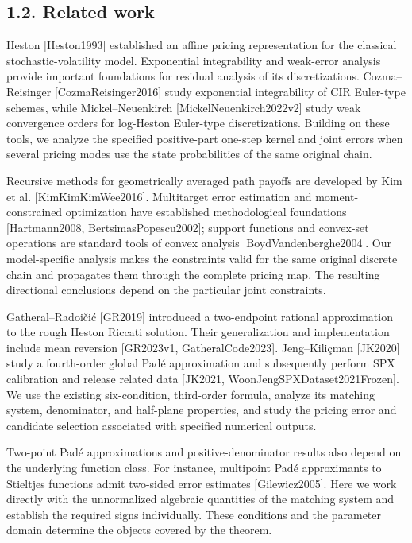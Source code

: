 \documentclass[a4paper,11pt]{article}
\begin{document}
\subsection*{1.2. Related work}

Heston [Heston1993] established an affine pricing representation for the classical stochastic-volatility model. Exponential integrability and weak-error analysis provide important foundations for residual analysis of its discretizations. Cozma–Reisinger [CozmaReisinger2016] study exponential integrability of CIR Euler-type schemes, while Mickel–Neuenkirch [MickelNeuenkirch2022v2] study weak convergence orders for log-Heston Euler-type discretizations. Building on these tools, we analyze the specified positive-part one-step kernel and joint errors when several pricing modes use the state probabilities of the same original chain.

Recursive methods for geometrically averaged path payoffs are developed by Kim et al. [KimKimKimWee2016]. Multitarget error estimation and moment-constrained optimization have established methodological foundations [Hartmann2008, BertsimasPopescu2002]; support functions and convex-set operations are standard tools of convex analysis [BoydVandenberghe2004]. Our model-specific analysis makes the constraints valid for the same original discrete chain and propagates them through the complete pricing map. The resulting directional conclusions depend on the particular joint constraints.

Gatheral–Radoičić [GR2019] introduced a two-endpoint rational approximation to the rough Heston Riccati solution. Their generalization and implementation include mean reversion [GR2023v1, GatheralCode2023]. Jeng–Kiliçman [JK2020] study a fourth-order global Padé approximation and subsequently perform SPX calibration and release related data [JK2021, WoonJengSPXDataset2021Frozen]. We use the existing six-condition, third-order formula, analyze its matching system, denominator, and half-plane properties, and study the pricing error and candidate selection associated with specified numerical outputs.

Two-point Padé approximations and positive-denominator results also depend on the underlying function class. For instance, multipoint Padé approximants to Stieltjes functions admit two-sided error estimates [Gilewicz2005]. Here we work directly with the unnormalized algebraic quantities of the matching system and establish the required signs individually. These conditions and the parameter domain determine the objects covered by the theorem.
\end{document}
